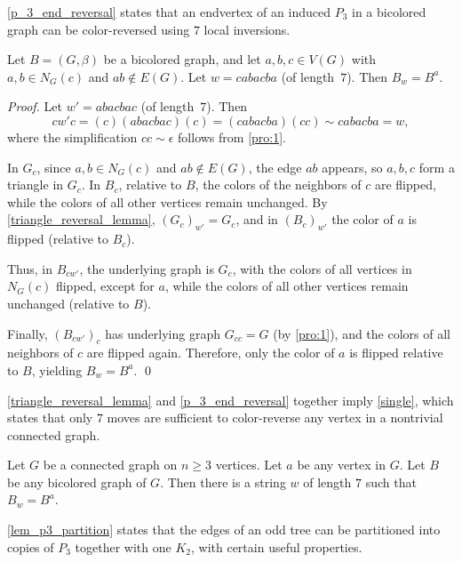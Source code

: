 \documentclass[runningheads,orivec]{llncs}
\begin{document}
\autoref{p_3_end_reversal} states that an endvertex of an induced $P_3$ in a bicolored graph can be color-reversed using $7$ local inversions.

\begin{lemma}
    \label{p_3_end_reversal}
    Let $B=(G,\beta)$ be a bicolored graph, and let $a,b,c\in V(G)$ with $a,b\in N_G(c)$ and $ab\notin E(G)$.  
    Let $w = cabacba$ (of length~$7$). Then $B_w = B^a$.
\end{lemma}

\begin{proof}
    Let $w' = abacbac$ (of length~$7$). Then
    \[
        cw'c = (c)(abacbac)(c) = (cabacba)(cc) \sim cabacba = w,
    \]
    where the simplification $cc \sim \epsilon$ follows from \autoref{pro:1}.
    
    In $G_c$, since $a,b\in N_G(c)$ and $ab\notin E(G)$, the edge $ab$ appears, so $a,b,c$ form a triangle in $G_c$.  
    In $B_c$, relative to $B$, the colors of the neighbors of $c$ are flipped, while the colors of all other vertices remain unchanged. 
    By \autoref{triangle_reversal_lemma}, $(G_c)_{w'} = G_c$, and in $(B_c)_{w'}$ the color of $a$ is flipped (relative to $B_c$). 
    
    Thus, in $B_{cw'}$, the underlying graph is $G_c$, with the colors of all vertices in $N_G(c)$ flipped, except for $a$, while the colors of all other vertices remain unchanged (relative to $B$). 
    
    Finally, $(B_{cw'})_c$ has underlying graph $G_{cc} = G$ (by \autoref{pro:1}), and the colors of all neighbors of $c$ are flipped again. Therefore, only the color of $a$ is flipped relative to $B$, yielding $B_w = B^a$.
    \qed
\end{proof}

\autoref{triangle_reversal_lemma} and \autoref{p_3_end_reversal} together imply \autoref{single}, which states that only $7$ moves are sufficient to color-reverse any vertex in a nontrivial connected graph.

\begin{lemma}
    \label{single}
    Let $G$ be a connected graph on $n\geq 3$ vertices. Let $a$ be any vertex in $G$. Let $B$ be any bicolored graph of $G$. Then there is a string $w$ of length $7$ such that $B_w = B^a$.
\end{lemma}

\autoref{lem_p3_partition} states that the edges of an odd tree can be partitioned into copies of $P_3$ together with one $K_2$, with certain useful properties.
\end{document}
